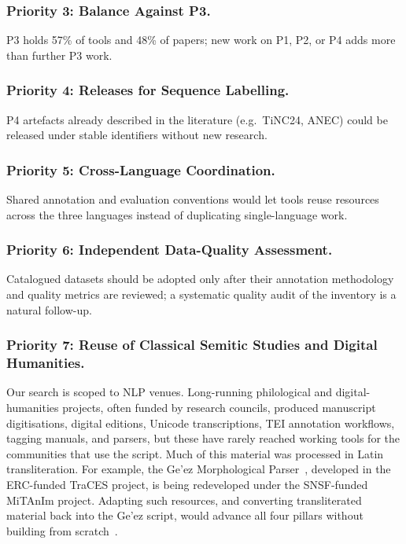 \documentclass[runningheads]{llncs}
\begin{document}
\subsubsection{Priority 3: Balance Against P3.} P3 holds 57\% of tools and 48\% of papers; new work on P1, P2, or P4 adds more than further P3 work.

\subsubsection{Priority 4: Releases for Sequence Labelling.} P4 artefacts already described in the literature (e.g.\ TiNC24, ANEC) could be released under stable identifiers without new research.

\subsubsection{Priority 5: Cross-Language Coordination.} Shared annotation and evaluation conventions would let tools reuse resources across the three languages instead of duplicating single-language work.

\subsubsection{Priority 6: Independent Data-Quality Assessment.} Catalogued datasets should be adopted only after their annotation methodology and quality metrics are reviewed; a systematic quality audit of the inventory is a natural follow-up.

\subsubsection{Priority 7: Reuse of Classical Semitic Studies and Digital Humanities.} Our search is scoped to NLP venues. Long-running philological and digital-humanities projects, often funded by research councils, produced manuscript digitisations, digital editions, Unicode transcriptions, TEI annotation workflows, tagging manuals, and parsers, but these have rarely reached working tools for the communities that use the script. Much of this material was processed in Latin transliteration. For example, the Ge'ez Morphological Parser~\cite{liuzzo_geez_2019}, developed in the ERC-funded TraCES project, is being redeveloped under the SNSF-funded MiTAnIm project. Adapting such resources, and converting transliterated material back into the Ge'ez script, would advance all four pillars without building from scratch~\cite{digitalorientalist2026}.
\end{document}
